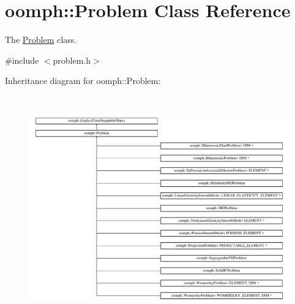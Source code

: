 \hypertarget{classoomph_1_1Problem}{}\section{oomph\+:\+:Problem Class Reference}
\label{classoomph_1_1Problem}


The \hyperlink{classoomph_1_1Problem}{Problem} class.  




{\ttfamily \#include $<$problem.\+h$>$}

Inheritance diagram for oomph\+:\+:Problem\+:\begin{figure}[H]
\begin{center}
\leavevmode
\includegraphics[height=9.744780cm]{classoomph_1_1Problem}
\end{center}
\end{figure}

